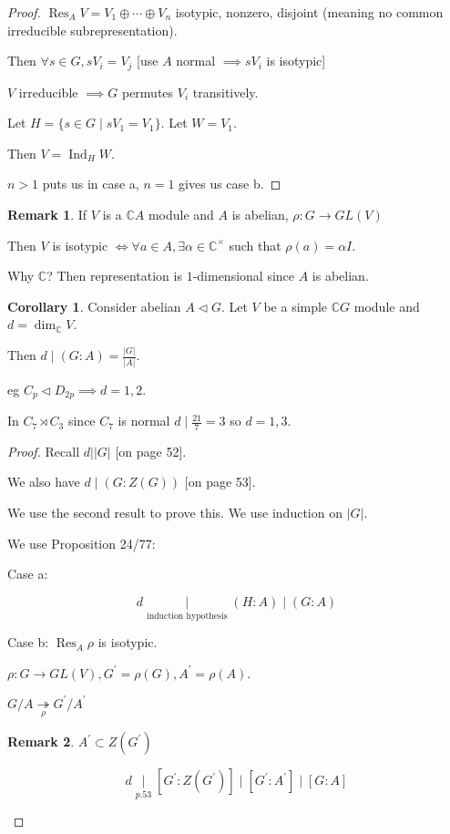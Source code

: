 \documentclass{article}
\theoremstyle{definition}
\newtheorem{corollary}[theorem]{Corollary}
\newtheorem*{remark}{Remark}
\begin{document}
\begin{proof}
    \(\operatorname{Res} _A V = V_1 \oplus \cdots \oplus V_n\) isotypic, nonzero, disjoint (meaning no common irreducible subrepresentation).

    Then \(\forall s\in G, s V_i = V_j\) [use \(A\) normal \(\implies s V_i\) is isotypic]

    \(V\) irreducible \(\implies G\) permutes \(V_i\) transitively.

    Let \(H = \{ s\in G \mid s V_1 = V_1 \}\). Let \(W = V_1\).
    
    Then \(V = \operatorname{Ind}_H W\).

    \(n > 1\) puts us in case a, \(n = 1\) gives us case b.
\end{proof}

\begin{remark}
    If \(V\) is a \(\mathbb{C} A\) module and \(A\) is abelian, \(\rho: G \to GL(V)\) 
    
    Then \(V\) is isotypic \(\iff \forall a\in A, \exists \alpha \in \mathbb{C}^\times\) such that \(\rho(a)= \alpha I\). 

    Why \(\mathbb{C}\)? Then representation is \(1\)-dimensional since \(A\) is abelian.
\end{remark}

\begin{corollary}
    Consider abelian \(A \triangleleft G\). Let \(V\) be a simple \(\mathbb{C} G\) module and \(d = \dim_\mathbb{C} V\).

    Then \(d\mid (G:A) = \frac{\vert G \vert }{\vert A \vert}\).
    
    eg \(C_p \triangleleft D_{2p} \implies d = 1,2\).
    
    In \(C_7 \rtimes C_3\) since \(C_7\) is normal \(d\mid \frac{21}{7} = 3\) so \(d=1,3\). 
\end{corollary}

\begin{proof}
    Recall \(d\mid \vert G \vert\) [on page 52].

    We also have \(d\mid (G : Z(G))\) [on page 53].
    
    We use the second result to prove this. We use induction on \(\vert G \vert\).

    We use Proposition 24/77:

    Case a:

    \[
        d \underset{\text{induction hypothesis}}{\mid} (H:A) \mid (G:A)
    \]

    Case b: \(\operatorname{Res}_A \rho\) is isotypic.

    \(\rho: G \to GL(V), G^{\prime} = \rho(G), A^{\prime} = \rho(A)\).

    \(G / A \underset{\rho}{\twoheadrightarrow} G^{\prime} / A^{\prime} \) 

    \begin{remark}
        \(A^{\prime} \subset Z(G^{\prime})\)

        \[
            d \underset{p.53}{\mid} [G^{\prime} : Z(G^{\prime} )] \mid [G^{\prime} : A^{\prime}] \mid [G:A]
        \]
    \end{remark}

\end{proof}
\end{document}
